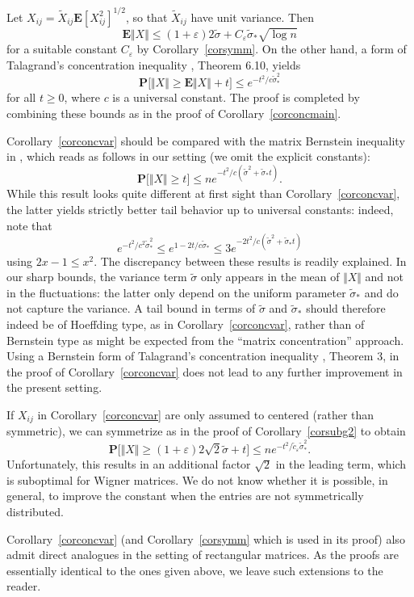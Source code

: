 \documentclass[aop,MSNbibl,dvips]{arximspdf}
\newcommand{\rrVert}{\Vert}
\newcommand{\llVert}{\Vert}
\newcommand{\EE}{\mathbf{E}}
\begin{document}
\begin{pf}
Let $X_{ij}=\tilde X_{ij}\EE[X_{ij}^2]^{1/2}$, so that
$\tilde X_{ij}$ have unit variance. Then
%
\[
\EE\llVert X\rrVert\le(1+\varepsilon)2\tilde\sigma+ C_\varepsilon
\tilde
\sigma_*\sqrt{\log n} %
\]
%
for a suitable constant $C_\varepsilon$ by
Corollary~\ref{corsymm}. On the other hand,
a form of Talagrand's
concentration inequality \cite{BLM13}, Theorem 6.10, yields
%
\[
\mathbf{P}\bigl[\llVert X\rrVert\ge\EE\llVert X\rrVert+ t\bigr] \le
e^{-t^2/c\tilde\sigma_*^2} %
\]
%
for all $t\ge0$, where $c$ is a universal constant.
The proof is completed by combining these bounds as in the
proof of Corollary~\ref{corconcmain}.
\end{pf}

Corollary~\ref{corconcvar} should be compared with the matrix Bernstein
inequality in \cite{Tro12}, which reads as follows in our setting
(we omit the explicit constants):
%
\[
\mathbf{P}\bigl[\llVert X\rrVert\ge t\bigr] \le n e^{-t^2/c(\tilde
\sigma^2+\tilde\sigma_*t)}. %
\]
%
While this result looks quite different at first sight than
Corollary~\ref{corconcvar}, the latter yields strictly better tail behavior
up to universal constants: indeed, note that
%
\[
e^{-t^2/c^2\tilde\sigma_*^2} \le e^{1-2t/c\tilde\sigma_*} \le
3e^{-2t^2/c(\tilde\sigma^2+\tilde\sigma_*t)} %
\]
%
using $2x-1\le x^2$. The discrepancy between these results is readily
explained. In our sharp bounds, the variance term $\tilde\sigma$ only
appears in the mean of $\llVert X\rrVert $ and not in the
fluctuations: the latter
only depend on the uniform parameter $\tilde\sigma_*$ and do not capture
the variance. A tail bound in terms of $\tilde\sigma$ and
$\tilde\sigma_*$ should therefore indeed be of Hoeffding type, as in
Corollary~\ref{corconcvar}, rather than of Bernstein type as might be
expected from the ``matrix concentration'' approach. Using a Bernstein
form of Talagrand's concentration inequality \cite{Mas00}, Theorem 3,
in the proof of Corollary~\ref{corconcvar} does not lead to any further
improvement in the present setting.

%
\begin{rem}
If $X_{ij}$ in Corollary~\ref{corconcvar} are only
assumed to centered (rather than symmetric), we can symmetrize as in
the proof of Corollary~\ref{corsubg2} to obtain
%
\[
\mathbf{P}\bigl[\llVert X\rrVert\ge(1+\varepsilon)2\sqrt{2}\tilde\sigma
+t\bigr]
\le ne^{-t^2/\tilde c_\varepsilon\tilde\sigma_*^2}. %
\]
%
Unfortunately, this results in an additional factor $\sqrt{2}$ in
the leading term, which is suboptimal for Wigner matrices. We do not
know whether it is possible, in general, to improve the constant
when the entries are not symmetrically distributed.

Corollary~\ref{corconcvar} (and Corollary~\ref{corsymm} which is used
in its proof) also admit direct analogues in the setting of rectangular
matrices. As the proofs are essentially identical to the ones given
above, we leave such extensions to the reader.
\end{rem}
\end{document}
